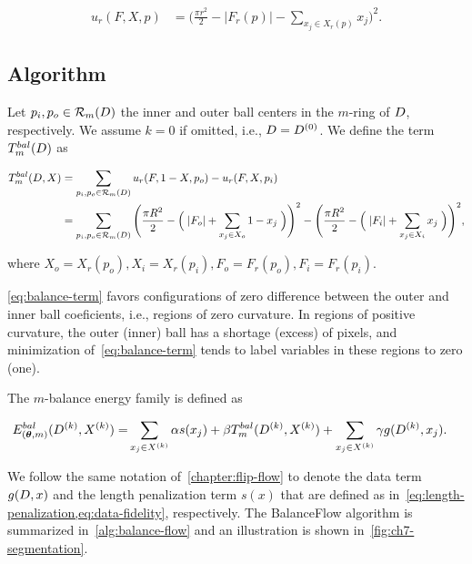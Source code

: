 \begin{align*}
	u_r(F,X,p) &=  \Big( \frac{\pi r^2}{2} - |F_r(p)| - \sum_{x_j \in X_r(p)}{x_j} \Big)^2.
\end{align*}

\subsection{Algorithm}

Let $p_i, p_o \in \mathcal{R}_m(D)$ the inner and outer ball centers in the $m$-ring of $D$, respectively. We assume $k=0$ if omitted, i.e., $D=D^{(0)}$. We define the term $T_{m}^{bal}(D)$ as

\begin{align}
	T_{m}^{bal}(D,X) &= \sum_{p_i,p_o \in \mathcal{R}_m(D)}{u_r(F,1-X,p_o) - u_r(F,X,p_i)} \nonumber \\
	&=  \sum_{p_i,p_o \in \mathcal{R}_m(D)}{\Bigg( \frac{\pi R^2}{2} - \Big(\; |F_o| + \sum_{ x_j \in X_o}{1-x_j} \; \Big) \Bigg)^2 -\Bigg(\frac{\pi R^2}{2} - \Big(\; |F_i| + \sum_{x_j \in X_i}{x_j}\;\Big)\Bigg)^2},
	\label{eq:balance-term}
\end{align}

where $X_o=X_r(p_o), X_i=X_r(p_i), F_o=F_r(p_o), F_i=F_r(p_i)$.


\cref{eq:balance-term} favors configurations of zero difference between the outer and inner ball coeficients, i.e., regions of zero curvature. In regions of positive curvature, the outer (inner) ball has a shortage (excess) of pixels, and minimization of~\cref{eq:balance-term} tends to label variables in these regions to zero (one).

The $m$-balance energy family is defined as

\begin{align}
  E_{(\bm{\theta},m)}^{bal}(D^{(k)},X^{(k)}) =& \sum_{x_j \in X^{(k)}}{\alpha s(x_j)} + \beta T_{m}^{bal}(D^{(k)},X^{(k)}) + \sum_{x_j \in X^{(k)}}{\gamma g(D^{(k)},x_j)}.
  \label{eq:single-step-energy-family}
\end{align}

We follow the same notation of~\cref{chapter:flip-flow} to denote the data term $g(D,x)$ and the length penalization term $s(x)$ that are defined as in~\cref{eq:length-penalization,eq:data-fidelity}, respectively. The BalanceFlow algorithm is summarized in~\cref{alg:balance-flow} and an illustration is shown in~\cref{fig:ch7-segmentation}.

